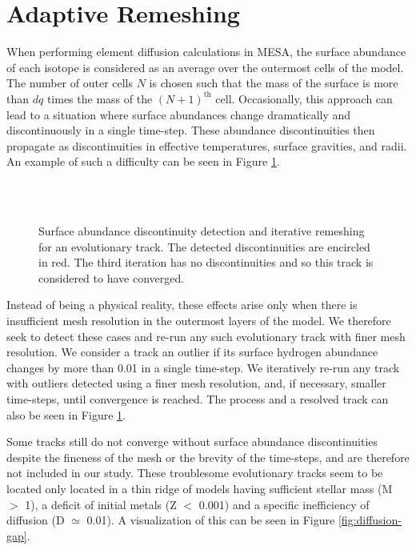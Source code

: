 \documentclass[iop,apj,twocolappendix]{emulateapj}
\begin{document}
\section{Adaptive Remeshing}
\label{sec:remeshing}

When performing element diffusion calculations in MESA, the surface abundance of each isotope is considered as an average over the outermost cells of the model. The number of outer cells $N$ is chosen such that the mass of the surface is more than $dq$ times the mass of the $(N+1)^{\text{th}}$ cell. Occasionally, this approach can lead to a situation where surface abundances change dramatically and discontinuously in a single time-step. These abundance discontinuities then propagate as discontinuities in effective temperatures, surface gravities, and radii. An example of such a difficulty can be seen in Figure \ref{fig:discontinuity}. 

\begin{figure}
    \centering
    \\
    \\
    \caption{Surface abundance discontinuity detection and iterative remeshing for an evolutionary track. The detected discontinuities are encircled in red. The third iteration has no discontinuities and so this track is considered to have converged. }
    \label{fig:discontinuity}
\end{figure}

Instead of being a physical reality, these effects arise only when there is insufficient mesh resolution in the outermost layers of the model. We therefore seek to detect these cases and re-run any such evolutionary track with finer mesh resolution. We consider a track an outlier if its surface hydrogen abundance changes by more than 0.01 in a single time-step. We iteratively re-run any track with outliers detected using a finer mesh resolution, and, if necessary, smaller time-steps, until convergence is reached. The process and a resolved track can also be seen in Figure \ref{fig:discontinuity}. 

Some tracks still do not converge without surface abundance discontinuities despite the fineness of the mesh or the brevity of the time-steps, and are therefore not included in our study. These troublesome evolutionary tracks seem to be located only located in a thin ridge of models having sufficient stellar mass (M $>$ 1), a deficit of initial metals (Z $<$ 0.001) and a specific inefficiency of diffusion (D $\simeq$ 0.01). A visualization of this can be seen in Figure \ref{fig:diffusion-gap}.
\end{document}
